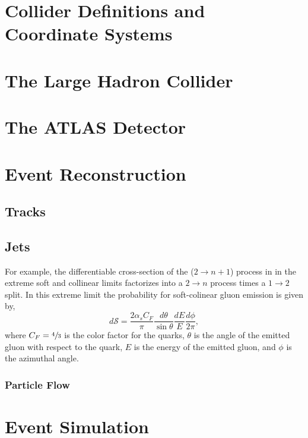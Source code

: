 
\section{Collider Definitions and Coordinate Systems}

\section{The Large Hadron Collider}

\section{The ATLAS Detector}

\section{Event Reconstruction}
\label{sec:event_reconstruction}

\subsection{Tracks}

\subsection{Jets}

For example, the differentiable cross-section of the ($2\rightarrow n+1$) process in  in the extreme soft and collinear limits factorizes into a $2 \rightarrow n$ process times a $1 \rightarrow 2$ split.
In this extreme limit the probability for soft-colinear gluon emission is given by,
\begin{equation}
	\label{eq:gluon_emission}
	d \mathcal{S} = \frac{2 \alpha_s C_F}{\pi} \frac{d \theta}{\sin\theta} \frac{dE}{E} \frac{d\phi}{2\pi},
\end{equation}
where $C_F = \sfrac{4}{3}$ is the color factor for the quarks, $\theta$ is the angle of the emitted gluon with respect to the quark, $E$ is the energy of the emitted gluon, and $\phi$ is the azimuthal angle.

\subsubsection{Particle Flow}
\label{sec:particle_flow}

\section{Event Simulation}

